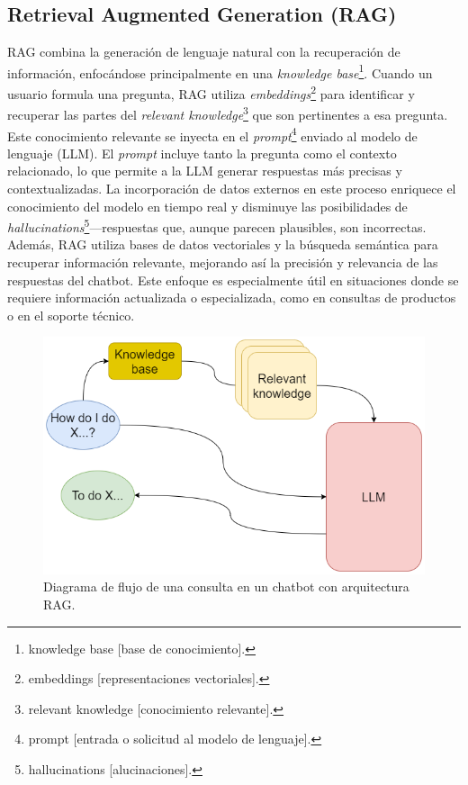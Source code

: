   
  \subsection{Retrieval Augmented Generation (RAG)}
  
  RAG combina la generación de lenguaje natural con la recuperación de información, enfocándose principalmente en una \textit{knowledge base}\footnote{knowledge base [base de conocimiento].}. Cuando un usuario formula una pregunta, RAG utiliza \textit{embeddings}\footnote{embeddings [representaciones vectoriales].} para identificar y recuperar las partes del \textit{relevant knowledge}\footnote{relevant knowledge [conocimiento relevante].} que son pertinentes a esa pregunta.
  Este conocimiento relevante se inyecta en el \textit{prompt}\footnote{prompt [entrada o solicitud al modelo de lenguaje].} enviado al modelo de lenguaje (LLM). El \textit{prompt} incluye tanto la pregunta como el contexto relacionado, lo que permite a la LLM generar respuestas más precisas y contextualizadas. La incorporación de datos externos en este proceso enriquece el conocimiento del modelo en tiempo real y disminuye las posibilidades de \textit{hallucinations}\footnote{hallucinations [alucinaciones].}—respuestas que, aunque parecen plausibles, son incorrectas.
  Además, RAG utiliza bases de datos vectoriales y la búsqueda semántica para recuperar información relevante, mejorando así la precisión y relevancia de las respuestas del chatbot. Este enfoque es especialmente útil en situaciones donde se requiere información actualizada o especializada, como en consultas de productos o en el soporte técnico.

 \vspace{1cm}
 \begin{figure}[htbp] 
	\centering
	\includegraphics[width=.75\textwidth]{./Figures/RAG.png}
	\caption{Diagrama de flujo de una consulta en un chatbot con arquitectura RAG.}
	\label{fig:arquitectura_rag}
\end{figure}
\vspace{1cm}


